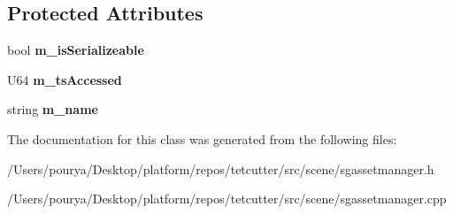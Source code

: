 \subsection*{Protected Attributes}
\begin{DoxyCompactItemize}
\item 
\hypertarget{classps_1_1scene_1_1Asset_a6297f3ca1e396c083a610f1067bdce9a}{}bool {\bfseries m\+\_\+is\+Serializeable}\label{classps_1_1scene_1_1Asset_a6297f3ca1e396c083a610f1067bdce9a}

\item 
\hypertarget{classps_1_1scene_1_1Asset_a5575521b33ef60c798acb2d2fa95c532}{}U64 {\bfseries m\+\_\+ts\+Accessed}\label{classps_1_1scene_1_1Asset_a5575521b33ef60c798acb2d2fa95c532}

\item 
\hypertarget{classps_1_1scene_1_1Asset_a6f18386d1a1fd1f0cab5032ffd065d69}{}string {\bfseries m\+\_\+name}\label{classps_1_1scene_1_1Asset_a6f18386d1a1fd1f0cab5032ffd065d69}

\end{DoxyCompactItemize}


The documentation for this class was generated from the following files\+:\begin{DoxyCompactItemize}
\item 
/\+Users/pourya/\+Desktop/platform/repos/tetcutter/src/scene/sgassetmanager.\+h\item 
/\+Users/pourya/\+Desktop/platform/repos/tetcutter/src/scene/sgassetmanager.\+cpp\end{DoxyCompactItemize}
